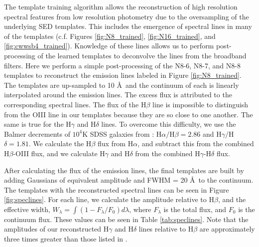 \documentclass[twocolumn]{aastex63}
\begin{document}
    The template training algorithm allows the reconstruction of high resolution spectral features from low resolution photometry due to the oversampling of the underlying SED templates.
    This includes the emergence of spectral lines in many of the templates (c.f. Figures \ref{fig:N8_trained}, \ref{fig:N16_trained}, and \ref{fig:cwwsb4_trained}).
    Knowledge of these lines allows us to perform post-processing of the learned templates to deconvolve the lines from the broadband filters.
    Here we perform a simple post-processing of the N8-6, N8-7, and N8-8 templates to reconstruct the emission lines labeled in Figure \ref{fig:N8_trained}.
    The templates are up-sampled to 10 \AA\ and the continuum of each is linearly interpolated around the emission lines.
    The excess flux is attributed to the corresponding spectral lines. 
    The flux of the H$\beta$ line is impossible to distinguish from the OIII line in our templates because they are so close to one another.
    The same is true for the H$\gamma$ and H$\delta$ lines.
    To overcome this difficulty, we use the Balmer decrements of $10^4$K SDSS galaxies from \citet{Groves2012a}: H$\alpha/$H$\beta = 2.86$ and H$\gamma/$H$\delta = 1.81$.
    We calculate the H$\beta$ flux from H$\alpha$, and subtract this from the combined H$\beta$-OIII flux, and we calculate H$\gamma$ and H$\delta$ from the combined H$\gamma$-H$\delta$ flux.

    After calculating the flux of the emission lines, the final templates are built by adding Gaussians of equivalent amplitude and FWHM = 20 \AA\ to the continuum. 
    The templates with the reconstructed spectral lines can be seen in Figure \ref{fig:speclines}.
    For each line, we calculate the amplitude relative to H$\beta$, and the effective width, $W_\lambda = \int (1 - F_\lambda/F_0) d\lambda$, where $F_\lambda$ is the total flux, and $F_0$ is the continuum flux.
    These values can be seen in Table \ref{tab:speclines}.
    Note that the amplitudes of our reconstructed H$\gamma$ and H$\delta$ lines relative to H$\beta$ are approximately three times greater than those listed in \citet{Groves2012a}.
\end{document}
